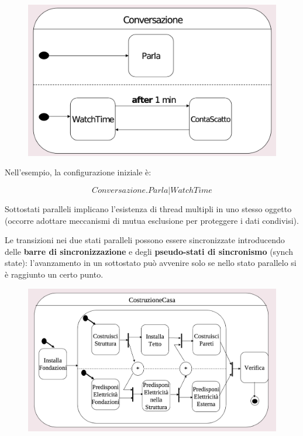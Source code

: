 \begin{figure}[H]
    \centering
    \includegraphics[width=0.7\linewidth]{assets/UML/state/state8.png}
\end{figure}

Nell'esempio, la configurazione iniziale è:

$$Conversazione.Parla|WatchTime$$ 

Sottostati paralleli implicano l'esistenza di thread multipli in uno stesso oggetto (occorre adottare meccanismi di mutua esclusione per proteggere i dati condivisi).

Le transizioni nei due stati paralleli possono essere sincronizzate introducendo delle \textbf{barre di sincronizzazione} e degli \textbf{pseudo-stati di sincronismo} (synch state): l'avanzamento in un sottostato può avvenire solo se nello stato parallelo si è raggiunto un certo punto.

\begin{figure}[H]
    \centering
    \includegraphics[width=0.7\linewidth]{assets/UML/state/state9.png}
\end{figure}

\newpage
